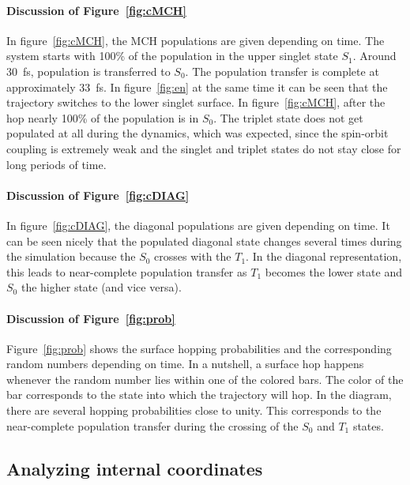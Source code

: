 \documentclass[a4paper,11pt,DIV=15,openany]{scrbook}
\begin{document}
\paragraph{Discussion of Figure~\ref{fig:cMCH}}

In figure~\ref{fig:cMCH}, the MCH populations are given depending on time. The system starts with 100\% of the population in the upper singlet state $S_1$. Around 30~fs, population is transferred to $S_0$. The population transfer is complete at approximately 33~fs. In figure~\ref{fig:en} at the same time it can be seen that the trajectory switches to the lower singlet surface. In figure~\ref{fig:cMCH}, after the hop nearly 100\% of the population is in $S_0$. The triplet state does not get populated at all during the dynamics, which was expected, since the spin-orbit coupling is extremely weak and the singlet and triplet states do not stay close for long periods of time.

\paragraph{Discussion of Figure~\ref{fig:cDIAG}}

In figure~\ref{fig:cDIAG}, the diagonal populations are given depending on time. It can be seen nicely that the populated diagonal state changes several times during the simulation because the $S_0$ crosses with the $T_1$. In the diagonal representation, this leads to near-complete population transfer as $T_1$ becomes the lower state and $S_0$ the higher state (and vice versa).

\paragraph{Discussion of Figure~\ref{fig:prob}}

Figure~\ref{fig:prob} shows the surface hopping probabilities and the corresponding random numbers depending on time. In a nutshell, a surface hop happens whenever the random number lies within one of the colored bars. The color of the bar corresponds to the state into which the trajectory will hop. In the diagram, there are several hopping probabilities close to unity. This corresponds to the near-complete population transfer during the crossing of the $S_0$ and $T_1$ states. 




\clearpage
\subsection{Analyzing internal coordinates}
\end{document}
